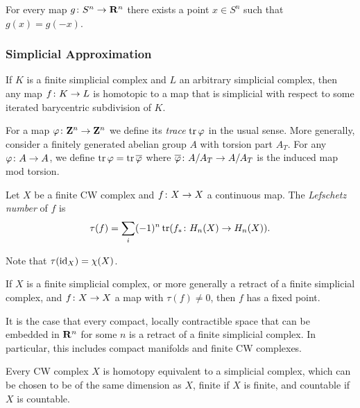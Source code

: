 \begin{corollary}
  For every map $g \colon S^n \rightarrow \mathbf{R}^n$ there exists a point $x \in S^n$ such that $g(x) = g(-x)$.
\end{corollary}

\subsubsection{Simplicial Approximation}

\begin{theorem}
  If $K$ is a finite simplicial complex and $L$ an arbitrary simplicial complex, then any map $f \colon K \rightarrow L$ is homotopic to a map that is simplicial with respect to some iterated barycentric subdivision of $K$.
\end{theorem}

For a map $\varphi \colon \mathbf{Z}^n \rightarrow \mathbf{Z}^n$ we define its \emph{trace} $\operatorname{tr} \varphi$ in the usual sense. More generally, consider a finitely generated abelian group $A$ with torsion part $A_T$. For any $\varphi \colon A \rightarrow A$, we define $\operatorname{tr} \varphi = \operatorname{tr}\overline{\varphi}$ where $\overline{\varphi} \colon A/A_T \rightarrow A/A_T$ is the induced map mod torsion.

\begin{definition}
  Let $X$ be a finite CW complex and $f \colon X \rightarrow X$ a continuous map. The \emph{Lefschetz number} of $f$ is
  \[
  \tau(f) = \sum_i (-1)^n \operatorname{tr}(f_\ast \colon H_n(X) \rightarrow H_n(X)).
  \]
\end{definition}

Note that $\tau(\operatorname{id}_X) = \chi(X)$.

\begin{theorem}
  If $X$ is a finite simplicial complex, or more generally a retract of a finite simplicial complex, and $f \colon X \rightarrow X$ a map with $\tau(f) \neq 0$, then $f$ has a fixed point.
\end{theorem}

It is the case that every compact, locally contractible space that can be embedded in $\mathbf{R}^n$ for some $n$ is a retract of a finite simplicial complex. In particular, this includes compact manifolds and finite CW complexes.

\begin{theorem}
  Every CW complex $X$ is homotopy equivalent to a simplicial complex, which can be chosen to be of the same dimension as $X$, finite if $X$ is finite, and countable if $X$ is countable.
\end{theorem}

